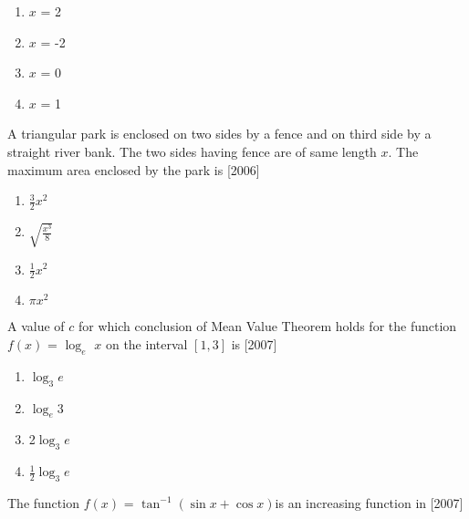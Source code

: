 \documentclass[journal,12pt,twocolumn]{IEEEtran}
\theoremstyle{remark}
\begin{document}
        \begin{enumerate}
        
            
        
         \item $x$ = 2
        \item $x$ = -2
        \item $x$ = 0
        \item $x$ = 1
        
            
        \end{enumerate}
        \item A triangular park is enclosed on two sides by a fence and on third side by a straight river bank. The two sides having fence are of same length $x$. The maximum area enclosed by the park is \hfill[2006]
\begin{enumerate}
        
            
        
            \item $\frac{3}{2}$$x^2$
        \item $\sqrt{\frac{x^3}{8}}$
        \item $\frac{1}{2}$$x^2$
        \item $\pi$$x^2$
    
        \end{enumerate}
        \item A value of $c$ for which conclusion of Mean Value Theorem holds for the function $f(x)$ = $\log_e$ $x$ on the interval $[1,3]$ is \hfill[2007]
        \begin{enumerate}
        
            
        
            \item $\log_3$$e$
        \item $\log_e$3
        \item 2$\log_3$$e$
        \item $\frac{1}{2}$$\log_3$$e$

        \end{enumerate}
        \item The function $f(x)$ = $\tan^{-1}(\sin{x} + \cos{x})$is an increasing function in \hfill[2007]
    
\end{document}
